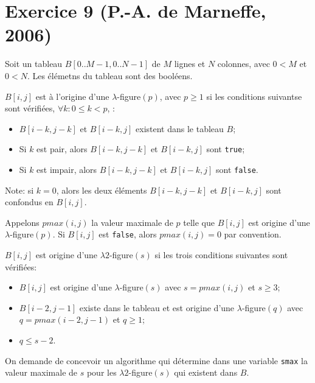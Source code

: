 \documentclass[a4paper,10pt]{article}
\begin{document}
\section*{Exercice 9 (P.-A. de Marneffe, 2006)}

Soit un tableau $B[0..M-1, 0..N-1]$ de $M$ lignes et $N$ colonnes, avec $0<M$ et
$0<N$. Les élémetns du tableau sont des booléens.

$B[i,j]$ est à l'origine d'une $\lambda$-figure$(p)$, avec $p\geq 1$ si les conditions suivantse sont vérifiées, $\forall k : 0 \leq k < p$, :

\begin{itemize}
\item $B[i-k,j-k]$ et $B[i-k,j]$ existent dans le tableau $B$;
\item Si $k$ est pair, alors $B[i-k,j-k]$ et $B[i-k,j]$ sont \texttt{true};
\item Si $k$ est impair, alors $B[i-k,j-k]$ et $B[i-k,j]$ sont \texttt{false}.
\end{itemize}

Note: si $k=0$, alors les deux éléments $B[i-k,j-k]$ et $B[i-k,j]$ sont confondus en $B[i,j]$.

Appelons $pmax(i,j)$ la valeur maximale de $p$ telle que $B[i,j]$ est origine d'une $\lambda$-figure$(p)$. Si $B[i,j]$ est \texttt{false}, alors $pmax(i,j)=0$ par convention.

$B[i,j]$ est origine d'une $\lambda 2$-figure$(s)$ si les trois conditions suivantes sont vérifiées:
\begin{itemize}
\item $B[i,j]$ est origine d'une $\lambda$-figure$(s)$ avec $s=pmax(i,j)$ et $s\geq3$;
\item $B[i-2,j-1]$ existe dans le tableau et est origine d'une $\lambda$-figure$(q)$ avec $q=pmax(i-2,j-1)$ et $q\geq1$;
\item $q \leq s-2$.
\end{itemize}

On demande de concevoir un algorithme qui détermine  dans une variable \texttt{smax} la valeur maximale de $s$ pour les $\lambda 2$-figure$(s)$ qui existent dans $B$.



\end{document}
